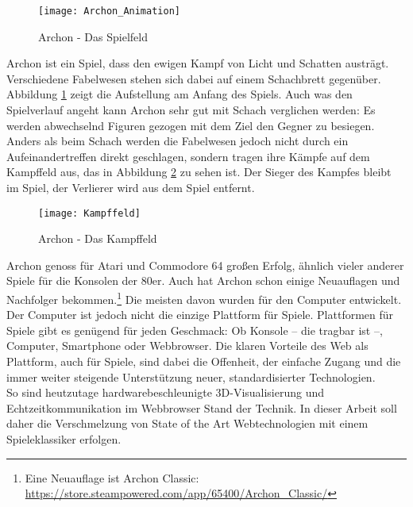 \clearpage
\begin{figure}[htp]
	\centering
	\captionsetup{justification=centering}
	\texttt{[image: Archon\_Animation]}
	\caption[Archon - Cover]{Archon - Das Spielfeld\footnotemark}
	\label{fig:Archon_Feld}
\end{figure}
\noindent Archon ist ein Spiel, dass den ewigen Kampf von Licht und Schatten austrägt. Verschiedene Fabelwesen stehen sich dabei auf einem Schachbrett gegenüber. Abbildung \ref{fig:Archon_Feld} zeigt die Aufstellung am Anfang des Spiels. Auch was den Spielverlauf angeht kann Archon sehr gut mit Schach verglichen werden: Es werden abwechselnd Figuren gezogen mit dem Ziel den Gegner zu besiegen. Anders als beim Schach werden die Fabelwesen jedoch nicht durch ein Aufeinandertreffen direkt geschlagen, sondern tragen ihre Kämpfe auf dem Kampffeld aus, das in Abbildung \ref{fig:Archon_Kampffeld} zu sehen ist. Der Sieger des Kampfes bleibt im Spiel, der Verlierer wird aus dem Spiel entfernt.
\begin{figure}[htp]
	\centering
	\captionsetup{justification=centering}
	\texttt{[image: Kampffeld]}
	\caption[Archon - Cover]{Archon - Das Kampffeld\footnotemark}
	\label{fig:Archon_Kampffeld}
\end{figure}

\noindent Archon genoss für Atari und Commodore 64 großen Erfolg, ähnlich vieler anderer Spiele für die Konsolen der 80er. Auch hat Archon schon einige Neuauflagen und Nachfolger bekommen.\footnote{Eine Neuauflage ist Archon Classic: \url{https://store.steampowered.com/app/65400/Archon_Classic/}}
Die meisten davon wurden für den Computer entwickelt. Der Computer ist jedoch nicht die einzige Plattform für Spiele.
Plattformen für Spiele gibt es genügend für jeden Geschmack: Ob Konsole -- die \ggf tragbar ist --, Computer, Smartphone oder Webbrowser.
Die klaren Vorteile des Web als Plattform, auch für Spiele, sind dabei die Offenheit, der einfache Zugang und die immer weiter steigende Unterstützung neuer, standardisierter Technologien.\\
So sind heutzutage hardwarebeschleunigte\footnotemark{} 3D-Visualisierung und Echtzeitkommunikation im Webbrowser Stand der Technik.
In dieser Arbeit soll daher die Verschmelzung von State of the Art Webtechnologien mit einem Spieleklassiker erfolgen.\\

